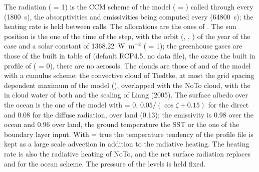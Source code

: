 The radiation ( = 1) is the CCM scheme of the model
( = ) called through  every 
(1800~s), the absorptivities and emissivities being computed every
 (64800~s); the heating rate is held between calls. The
allocations are the ones of . The sun position
is the one of the time of the step, with the orbit (,
, ) of the year of the case and a solar
constant of 1368.22~W~m$^{-2}$ ( = 1); the greenhouse
gases are those of the built in table of  (default
RCP4.5, no data file), the ozone the built in profile of 
( = 0), there are no aerosols. The clouds are those of
 and  of the model with a cumulus scheme:
the convective cloud of Tiedtke, at most the
grid spacing dependent maximum of the model (), overlapped with the NoTo cloud, with the in cloud water
of both and the scaling of Liang (2005). The surface albedo over the
ocean is the one of the model with  = 0,
$0.05/(\cos\zeta+0.15)$ for the direct and 0.08 for the diffuse
radiation, over land  (0.13); the emissivity is 0.98 over
the ocean and 0.96 over land, the ground temperature the SST or the one
of the boundary layer input. With  = true the
temperature tendency of the profile file is kept as a large scale
advection in addition to the radiative heating. The heating rate is
also the radiative heating of NoTo, and the net surface radiation replaces  and
 for the ocean scheme. The pressure of the levels is held
fixed.

